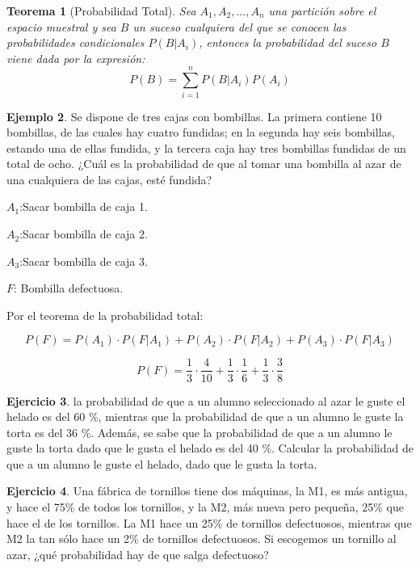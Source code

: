 \documentclass[]{book}
\theoremstyle{plain}
\newtheorem{theorem}{Teorema}[section]
\theoremstyle{definition}
\newtheorem{example}[theorem]{Ejemplo}
\newtheorem{exercise}[theorem]{Ejercicio}
\theoremstyle{definition} %
\begin{document}
 
\begin{theorem}[Probabilidad Total]
  Sea \(A_{1},A_{2},...,A_{n}\) una partición sobre el espacio muestral y
sea \(B\) un suceso cualquiera del que se conocen las probabilidades
condicionales \(P(B|A_i)\), entonces la probabilidad del suceso \(B\)
viene dada por la expresión:
\[{\displaystyle P(B)=\sum _{i=1}^{n}P(B|A_{i})P(A_{i})} \]
 
\end{theorem}


\begin{example}
  Se dispone de tres cajas con bombillas. La primera contiene 10
bombillas, de las cuales hay cuatro fundidas; en la segunda hay seis
bombillas, estando una de ellas fundida, y la tercera caja hay tres
bombillas fundidas de un total de ocho. ¿Cuál es la probabilidad de que
al tomar una bombilla al azar de una cualquiera de las cajas, esté
fundida?

\(A_1\):Sacar bombilla de caja 1.

\(A_2\):Sacar bombilla de caja 2.

\(A_3\):Sacar bombilla de caja 3.

\(F\): Bombilla defectuosa.

Por el teorema de la probabilidad total:

\[{P(F)=P(A_1)\cdot P(F|A_1) + P(A_2)\cdot P(F|A_2)+ P(A_3)\cdot P(F|A_3)}\]

\[P(F)=\frac{1}{3}\cdot \frac{4}{10} + \frac{1}{3}\cdot \frac{1}{6} + \frac{1}{3}\cdot \frac{3}{8}\]

\end{example}

\begin{exercise}

  la probabilidad de que a un alumno seleccionado al azar le guste el
  helado es del 60 \%, mientras que la probabilidad de que a un alumno
  le guste la torta es del 36 \%. Además, se sabe que la probabilidad de
  que a un alumno le guste la torta dado que le gusta el helado es del
  40 \%. Calcular la probabilidad de que a un alumno le guste el helado,
  dado que le gusta la torta.
\end{exercise}
  \begin{exercise}

  Una fábrica de tornillos tiene dos máquinas, la M1, es más antigua, y
  hace el 75\% de todos los tornillos, y la M2, más nueva pero pequeña,
  25\% que hace el de los tornillos. La M1 hace un 25\% de tornillos
  defectuosos, mientras que M2 la tan sólo hace un 2\% de tornillos
  defectuosos. Si escogemos un tornillo al azar, ¿qué probabilidad hay
  de que salga defectuoso?
\end{exercise}
\end{document}

